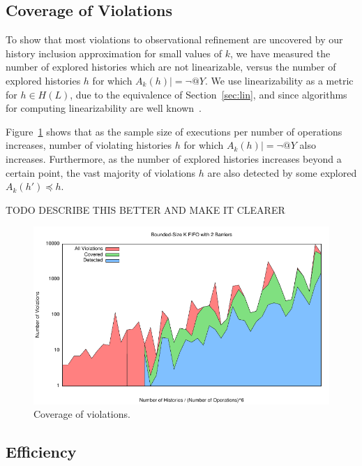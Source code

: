 \subsection{Coverage of Violations}

To show that most violations to observational refinement are uncovered by our
history inclusion approximation for small values of $k$, we have measured the
number of explored histories which are not linearizable, versus the number of
explored histories $h$ for which $A_k(h) |= \lnot @Y$. We use linearizability
as a metric for $h \in H(L)$, due to the equivalence of Section~\ref{sec:lin},
and since algorithms for computing linearizability are well
known~\cite{conf/pldi/BurckhardtDMT10}.

Figure~\ref{fig:data:coverage} shows that as the sample size of executions per
number of operations increases, number of violating histories $h$ for which
$A_k(h) |= \lnot @Y$ also increases. Furthermore, as the number of explored
histories increases beyond a certain point, the vast majority of violations $h$
are also detected by some explored $A_k(h') \preceq h$.

TODO DESCRIBE THIS BETTER AND MAKE IT CLEARER

\begin{figure}
  \centering
  \includegraphics[width=\linewidth]{figures/coverage-bkq-2-barriers}
  \caption{Coverage of violations.}
  \label{fig:data:coverage}
\end{figure}

\subsection{Efficiency}

